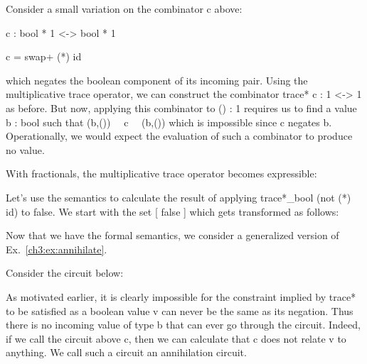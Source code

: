 \documentclass{llncs}
\begin{document}
\begin{example}
\label{ch3:ex:annihilate}
Consider a small variation on the combinator {{c}} above:

{{c : bool * 1 <-> bool * 1}} 

{{c = swap+ (*) id }}

\noindent which negates the boolean component of its incoming
pair. Using the multiplicative trace operator, we can construct the
combinator {{trace* c : 1 <-> 1}} as before. But now, applying this
combinator to {{() : 1}} requires us to find a value {{b : bool}} such
that {{(b,()) ~~c~~ (b,())}} which is impossible since {{c}} negates
{{b}}. Operationally, we would expect the evaluation of such a
combinator to produce no value. 
\end{example}

With fractionals, the multiplicative trace operator becomes expressible:


Let's use the semantics to calculate the result of applying
{{trace*_{bool} (not (*) id)}} to {{false}}. We start
with the set {{ {[ false ]} }} which gets transformed as follows:

Now that we have the formal semantics, we consider a generalized version of
Ex.~\ref{ch3:ex:annihilate}.

\begin{example}[Annihilation]
\label{ch3:ex;annihilation}
Consider the circuit below:
\begin{center}
\end{center}
As motivated earlier, it is clearly impossible for the constraint implied by
{{trace*}} to be satisfied as a boolean value {{v}} can never be the same as
its negation. Thus there is no incoming value of type {{b}} that can ever go
through the circuit. Indeed, if we call the circuit above {{c}}, then we can
calculate that {{c}} does not relate {{v}} to anything. We call such a
circuit an annihilation circuit.
\end{example}
\end{document}
